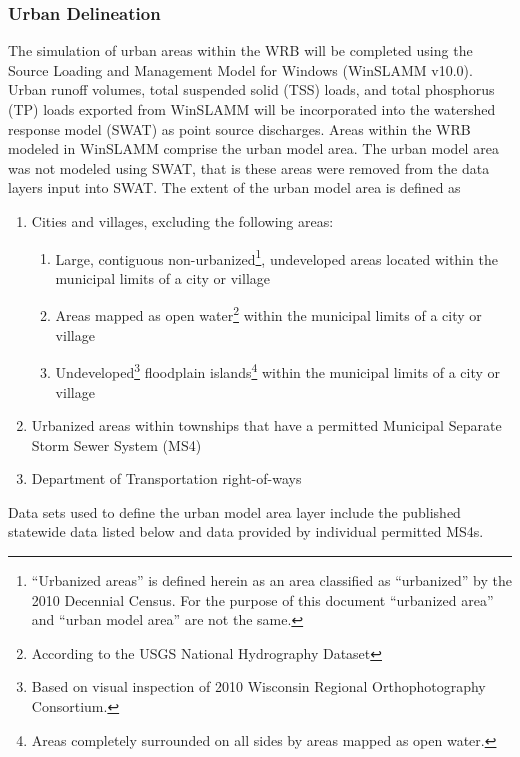 \subsubsection{Urban Delineation}\label{sec:urban}
The simulation of urban areas within the WRB will be completed using the Source Loading and Management Model for Windows (WinSLAMM v10.0). Urban runoff volumes, total suspended solid (TSS) loads, and total phosphorus (TP) loads exported from WinSLAMM will be incorporated into the watershed response model (SWAT) as point source discharges. Areas within the WRB modeled in WinSLAMM comprise the urban model area. The urban model area was not modeled using SWAT, that is these areas were removed from the data layers input into SWAT. The extent of the urban model area is defined as 

\begin{enumerate}
	\item Cities and villages, excluding the following areas:
	\begin{enumerate}
		\item Large, contiguous non-urbanized\footnote{``Urbanized areas'' is defined herein as an area classified as ``urbanized'' by the 2010 Decennial Census. For the purpose of this document ``urbanized area'' and ``urban model area'' are not the same.}, undeveloped areas located within the municipal limits of a city or village
		\item Areas mapped as open water\footnote{According to the USGS National Hydrography Dataset} within the municipal limits of a city or village
		\item Undeveloped\footnote{Based on visual inspection of 2010 Wisconsin Regional Orthophotography Consortium.} floodplain islands\footnote{Areas completely surrounded on all sides by areas mapped as open water.} within the municipal limits of a city or village
	\end{enumerate}

	\item Urbanized areas within townships that have a permitted Municipal Separate Storm Sewer System (MS4)
	\item Department of Transportation right-of-ways
\end{enumerate}

Data sets used to define the urban model area layer include the published statewide data listed below and data provided by individual permitted MS4s.

